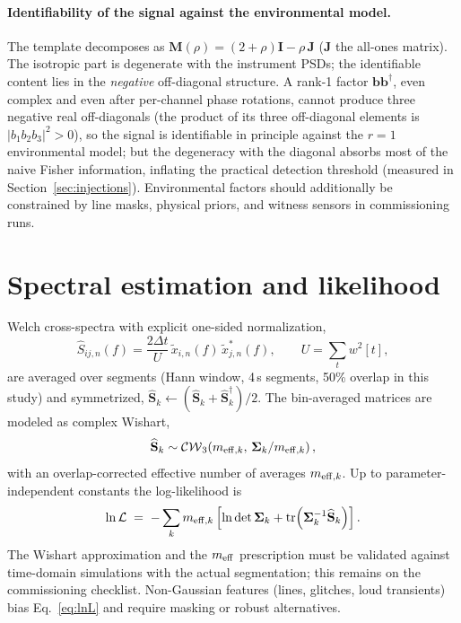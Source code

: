 \documentclass[11pt]{article}
\begin{document}
\paragraph{Identifiability of the signal against the environmental model.}
The template decomposes as $\mathbf{M}(\rho) = (2+\rho)\mathbf{I} - \rho\,\mathbf{J}$ ($\mathbf{J}$ the all-ones matrix). The isotropic part is degenerate with the instrument PSDs; the identifiable content lies in the \emph{negative} off-diagonal structure. A rank-1 factor $\mathbf{b}\mathbf{b}^\dagger$, even complex and even after per-channel phase rotations, cannot produce three negative real off-diagonals (the product of its three off-diagonal elements is $|b_1 b_2 b_3|^2 > 0$), so the signal is identifiable in principle against the $r=1$ environmental model; but the degeneracy with the diagonal absorbs most of the naive Fisher information, inflating the practical detection threshold (measured in Section~\ref{sec:injections}). Environmental factors should additionally be constrained by line masks, physical priors, and witness sensors in commissioning runs.

\section{Spectral estimation and likelihood}
\label{sec:likelihood}

Welch cross-spectra with explicit one-sided normalization,
\begin{equation}
\widehat{S}_{ij,n}(f) = \frac{2\Delta t}{U}\, \widetilde{x}_{i,n}(f)\, \widetilde{x}^{*}_{j,n}(f),
\qquad U = \sum_t w^2[t],
\end{equation}
are averaged over segments (Hann window, 4\,s segments, 50\% overlap in this study) and symmetrized, $\widehat{\mathbf{S}}_k \leftarrow (\widehat{\mathbf{S}}_k + \widehat{\mathbf{S}}_k^\dagger)/2$. The bin-averaged matrices are modeled as complex Wishart,
\begin{equation}
\widehat{\mathbf{S}}_k \sim \mathcal{CW}_3\!\left(m_{{\rm eff},k},\, \bm{\Sigma}_k / m_{{\rm eff},k}\right),
\end{equation}
with an overlap-corrected effective number of averages $m_{{\rm eff},k}$. Up to parameter-independent constants the log-likelihood is
\begin{equation}
\ln \mathcal{L} \;=\; -\sum_k m_{{\rm eff},k} \left[ \ln\det \bm{\Sigma}_k + \mathrm{tr}\!\left( \bm{\Sigma}_k^{-1} \widehat{\mathbf{S}}_k \right) \right].
\label{eq:lnL}
\end{equation}
The Wishart approximation and the $m_{\rm eff}$ prescription must be validated against time-domain simulations with the actual segmentation; this remains on the commissioning checklist. Non-Gaussian features (lines, glitches, loud transients) bias Eq.~\eqref{eq:lnL} and require masking or robust alternatives.
\end{document}
